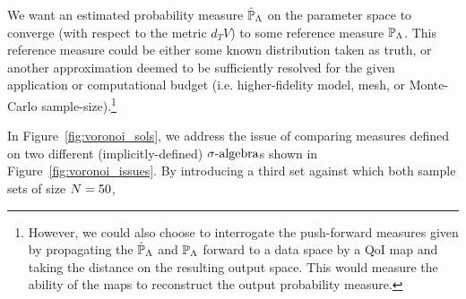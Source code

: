 We want an estimated probability measure $\hat{\mathbb{P}}_{\Lambda}$ on the parameter space to converge (with respect to the metric $d_TV$) to some reference measure $\mathbb{P}_{\Lambda}$.
This reference measure could be either some known distribution taken as truth, or another approximation deemed to be sufficiently resolved for the given application or computational budget (i.e. higher-fidelity model, mesh, or Monte-Carlo sample-size).\footnote{However, we could also choose to interrogate the push-forward measures given by propagating the $\hat{\mathbb{P}}_{\Lambda}$ and $\mathbb{P}_{\Lambda}$ forward to a data space by a QoI map and taking the distance on the resulting output space.
This would measure the ability of the maps to reconstruct the output probability measure.}

In Figure~\ref{fig:voronoi_sols}, we address the issue of comparing measures defined on two different (implicitly-defined) $\sigma\text{-algebra}$s shown in Figure~\ref{fig:voronoi_issues}.
By introducing a third set against which both sample sets of size $N=50$, 

